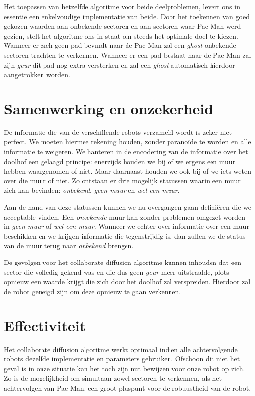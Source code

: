 \documentclass[12pt,a4paper]{report}
\begin{document}
Het toepassen van hetzelfde algoritme voor beide deelproblemen, levert ons in essentie een enkelvoudige implementatie van beide. Door het toekennen van goed gekozen waarden aan onbekende sectoren en aan sectoren waar Pac-Man werd gezien, stelt het algoritme ons in staat om steeds het optimale doel te kiezen. Wanneer er zich geen pad bevindt naar de Pac-Man zal een \emph{ghost} onbekende sectoren trachten te verkennen. Wanneer er een pad bestaat naar de Pac-Man zal zijn \emph{geur} dit pad nog extra versterken en zal een \emph{ghost} automatisch hierdoor aangetrokken worden.

\section{Samenwerking en onzekerheid}

De informatie die van de verschillende robots verzameld wordt is zeker niet perfect. We moeten hiermee rekening houden, zonder parano\"ide te worden en alle informatie te weigeren. We hanteren in de encodering van de informatie over het doolhof een gelaagd principe: enerzijds houden we bij of we ergens een muur hebben waargenomen of niet. Maar daarnaast houden we ook bij of we iets weten over die muur of niet. Zo ontstaan er drie mogelijk statussen waarin een muur zich kan bevinden: \emph{onbekend}, \emph{geen muur} en \emph{wel een muur}.

Aan de hand van deze statussen kunnen we nu overgangen gaan defini\"eren die we acceptable vinden. Een \emph{onbekende} muur kan zonder problemen omgezet worden in \emph{geen muur} of \emph{wel een muur}. Wanneer we echter over informatie over een muur beschikken en we krijgen informatie die tegenstrijdig is, dan zullen we de status van de muur terug naar \emph{onbekend} brengen.

De gevolgen voor het collaborate diffusion algoritme kunnen inhouden dat een sector die volledig gekend was en die dus geen \emph{geur} meer uitstraalde, plots opnieuw een waarde krijgt die zich door het doolhof zal verspreiden. Hierdoor zal de robot geneigd zijn om deze opnieuw te gaan verkennen.

\section{Effectiviteit}

Het collaborate diffusion algoritme werkt optimaal indien alle achtervolgende robots dezelfde implementatie en parameters gebruiken. Ofschoon dit niet het geval is in onze situatie kan het toch zijn nut bewijzen voor onze robot op zich. Zo is de mogelijkheid om simultaan zowel sectoren te verkennen, als het achtervolgen van Pac-Man, een groot pluspunt voor de robuustheid van de robot.
\end{document}
